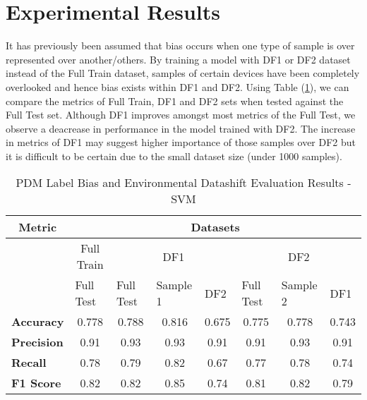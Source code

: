 \section{Experimental Results}
It has previously been assumed that bias occurs when one type of sample is over represented over another/others.
By training a model with DF1 or DF2 dataset instead of the Full Train dataset, samples of certain devices have been completely overlooked and hence bias exists within DF1 and DF2. 
Using Table (\ref{table:Bias}), we can compare the metrics of Full Train, DF1 and DF2 sets when tested against the Full Test set.
Although DF1 improves amongst most metrics of the Full Test, we observe a deacrease in performance in the model trained with DF2.
The increase in metrics of DF1 may suggest higher importance of those samples over DF2 but it is difficult to be certain due to the small dataset size (under 1000 samples).

\bigskip
\begin{table}[H]
    \begin{center}
        \caption{PDM Label Bias and Environmental Datashift Evaluation Results - SVM}
        \label{table:Bias}
        \begin{tabular}{lccccccc}
            \toprule
            \multicolumn{1}{c}{\textbf{Metric}} & \multicolumn{7}{c}{\textbf{Datasets}}                                                                                                                                                                                                      \\ \midrule
            \multicolumn{1}{l}{}      & \multicolumn{1}{c|}{Full Train} & \multicolumn{3}{c|}{DF1}                                                                       & \multicolumn{3}{c}{DF2}                                                                       \\ \cline{2-8} 
            \multicolumn{1}{l}{}      & \multicolumn{1}{l|}{Full Test}  & \multicolumn{1}{l|}{Full Test} & \multicolumn{1}{l|}{Sample 1} & \multicolumn{1}{l|}{DF2} & \multicolumn{1}{l|}{Full Test} & \multicolumn{1}{l|}{Sample 2} & \multicolumn{1}{l}{DF1} \\ 
            \midrule
            \textbf{Accuracy}   & 0.778 &0.788  &0.816  &0.675  &0.775      &0.778  &0.743\\
            \textbf{Precision}  &0.91   &0.93   &0.93   &0.91   &0.91       &0.93   &0.91\\
            \textbf{Recall}     &0.78   &0.79   &0.82   &0.67   &0.77       &0.78   &0.74\\
            \textbf{F1 Score}   &0.82   &0.82   &0.85   &0.74   &0.81       &0.82   &0.79\\
            \bottomrule
        \end{tabular}
    \end{center}
\end{table}

